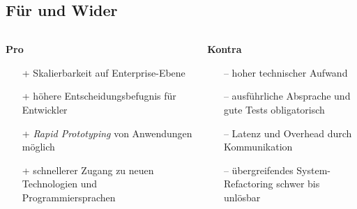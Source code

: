\documentclass{beamer}
\begin{document}

\def\Plus{\color{greenc}+}
\def\Minus{\color{redc}–}
\subsection{Für und Wider}
\begin{frame}{\insertsubsection}
	\begin{columns}
		\begin{column}{.5\linewidth}
			\centering\textbf{\textcolor{greenc}{Pro}}
			\begin{itemize}
				\item[\Plus] Skalierbarkeit auf Enterprise-Ebene
				\item[\Plus] höhere Entscheidungsbefugnis für Entwickler
				\item[\Plus] \textit{Rapid Prototyping} von Anwendungen möglich
				\item[\Plus] schnellerer Zugang zu neuen Technologien und Programmiersprachen
			\end{itemize}
		\end{column}
		\begin{column}{.5\linewidth}
			\centering\textbf{\textcolor{redc}{Kontra}}
			\begin{itemize}
				\item[\Minus] hoher technischer Aufwand
				\item[\Minus] ausführliche Absprache und gute Tests obligatorisch
				\item[\Minus] Latenz und Overhead durch Kommunikation
				\item[\Minus] übergreifendes System-Refactoring schwer bis unlösbar
			\end{itemize}
		\end{column}
	\end{columns}
	
\end{frame}
\end{document}
